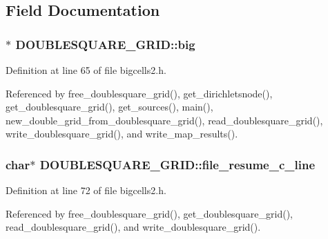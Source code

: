 \subsection{Field Documentation}
\hypertarget{struct_d_o_u_b_l_e_s_q_u_a_r_e___g_r_i_d_a5bc332bdc1ef4c2452778c2d26ad0c4c}{
\subsubsection[{big}]{$\ast$ D\-O\-U\-B\-L\-E\-S\-Q\-U\-A\-R\-E\-\_\-\-G\-R\-I\-D\-::big}}\label{struct_d_o_u_b_l_e_s_q_u_a_r_e___g_r_i_d_a5bc332bdc1ef4c2452778c2d26ad0c4c}


Definition at line 65 of file bigcells2.\-h.



Referenced by free\-\_\-doublesquare\-\_\-grid(), get\-\_\-dirichletsnode(), get\-\_\-doublesquare\-\_\-grid(), get\-\_\-sources(), main(), new\-\_\-double\-\_\-grid\-\_\-from\-\_\-doublesquare\-\_\-grid(), read\-\_\-doublesquare\-\_\-grid(), write\-\_\-doublesquare\-\_\-grid(), and write\-\_\-map\-\_\-results().

\hypertarget{struct_d_o_u_b_l_e_s_q_u_a_r_e___g_r_i_d_a8b1d557771e5f66e5b656af20eba8759}{
\subsubsection[{file\-\_\-resume\-\_\-c\-\_\-line}]{\setlength{\rightskip}{0pt plus 5cm}char$\ast$ D\-O\-U\-B\-L\-E\-S\-Q\-U\-A\-R\-E\-\_\-\-G\-R\-I\-D\-::file\-\_\-resume\-\_\-c\-\_\-line}}\label{struct_d_o_u_b_l_e_s_q_u_a_r_e___g_r_i_d_a8b1d557771e5f66e5b656af20eba8759}


Definition at line 72 of file bigcells2.\-h.



Referenced by free\-\_\-doublesquare\-\_\-grid(), get\-\_\-doublesquare\-\_\-grid(), read\-\_\-doublesquare\-\_\-grid(), and write\-\_\-doublesquare\-\_\-grid().

